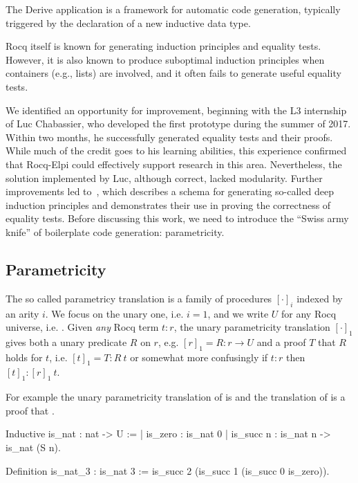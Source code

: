 \documentclass[a4paper, 11pt]{book}
\begin{document}
The Derive application is a framework for automatic code generation, 
typically triggered by the declaration of a new inductive data type.

Rocq itself is known for generating induction principles and equality tests.
However, it is also known to produce suboptimal induction principles when
containers (e.g., lists) are involved, and it often fails to generate useful
equality tests.

We identified an opportunity for improvement, beginning with the L3
internship of Luc Chabassier, who developed the first prototype during the
summer of 2017. Within two months, he successfully generated equality tests
and their proofs. While much of the credit goes to his learning abilities,
this experience confirmed that Rocq-Elpi could effectively support research
in this area. Nevertheless, the solution implemented by Luc, although correct,
lacked modularity. Further improvements led to~\cite{tassi:hal-01897468},
which describes a schema for generating so-called deep induction principles
and demonstrates their use in proving the correctness of equality tests.
Before discussing this work, we need to introduce the ``Swiss army knife''
of boilerplate code generation: parametricity.

\subsection{Parametricity}\label{sec:param1}

The so called parametricy translation \cite{keller_et_al:LIPIcs.CSL.2012.381}
is a family of procedures $[\cdot]_i$ indexed by an arity $i$. We focus on the
unary one, i.e. $i=1$, and we write $U$ for any Rocq universe, i.e. .
Given \emph{any} Rocq term $t : r$, the unary parametricity
translation $[\cdot]_1$ gives both a unary predicate $R$ on $r$, e.g. $[r]_1 = R : r \to U$
and a proof $T$ that $R$ holds for $t$, i.e. $[t]_1 = T : R~ t$ or somewhat more
confusingly if $t : r$ then $[t]_1 : [r]_1~ t$.

For example the unary parametricity translation of
 is  and
the translation of  is a proof that .

\begin{rocqcode}
Inductive is_nat : nat -> U :=
| is_zero : is_nat 0
| is_succ n : is_nat n -> is_nat (S n).

Definition is_nat_3 : is_nat 3 :=
  is_succ 2 (is_succ 1 (is_succ 0 is_zero)).
\end{rocqcode}
\end{document}

